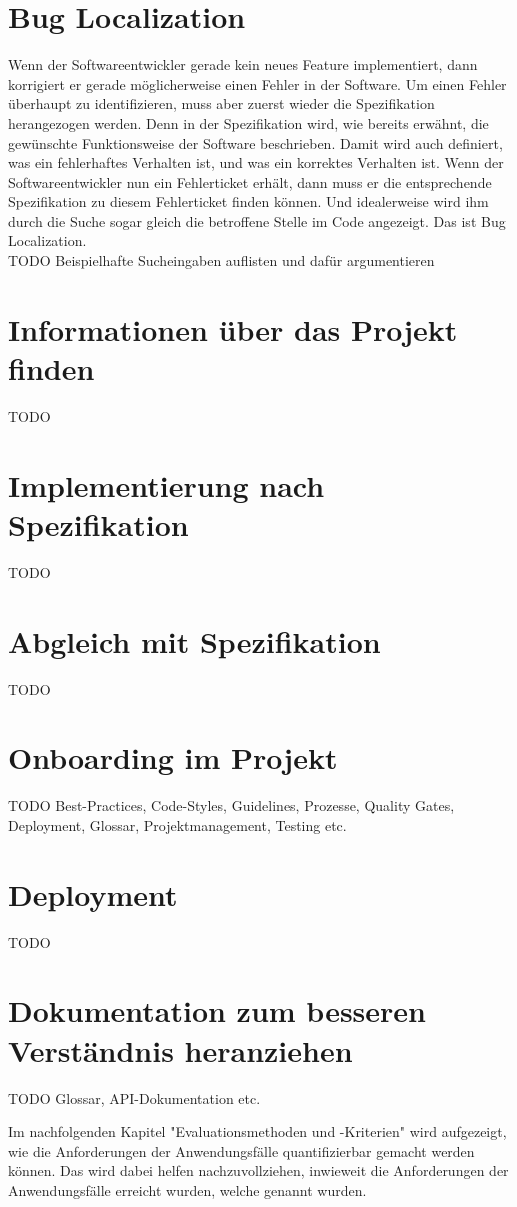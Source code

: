 \section{Bug Localization}
Wenn der Softwareentwickler gerade kein neues Feature implementiert, dann korrigiert er gerade möglicherweise einen Fehler in der Software.
Um einen Fehler überhaupt zu identifizieren, muss aber zuerst wieder die Spezifikation herangezogen werden.
Denn in der Spezifikation wird, wie bereits erwähnt, die gewünschte Funktionsweise der Software beschrieben.
Damit wird auch definiert, was ein fehlerhaftes Verhalten ist, und was ein korrektes Verhalten ist.
Wenn der Softwareentwickler nun ein Fehlerticket erhält, dann muss er die entsprechende Spezifikation zu diesem Fehlerticket finden können.
Und idealerweise wird ihm durch die Suche sogar gleich die betroffene Stelle im Code angezeigt.
Das ist Bug Localization.\\

TODO Beispielhafte Sucheingaben auflisten und dafür argumentieren

\section{Informationen über das Projekt finden}
TODO

\section{Implementierung nach Spezifikation}
TODO

\section{Abgleich mit Spezifikation}
TODO

\section{Onboarding im Projekt}
TODO Best-Practices, Code-Styles, Guidelines, Prozesse, Quality Gates, Deployment, Glossar, Projektmanagement, Testing etc.

\section{Deployment}
TODO

\section{Dokumentation zum besseren Verständnis heranziehen}
TODO Glossar, API-Dokumentation etc.

Im nachfolgenden Kapitel "Evaluationsmethoden und -Kriterien" wird aufgezeigt, wie die Anforderungen der Anwendungsfälle quantifizierbar gemacht werden können.
Das wird dabei helfen nachzuvollziehen, inwieweit die Anforderungen der Anwendungsfälle erreicht wurden, welche genannt wurden.
